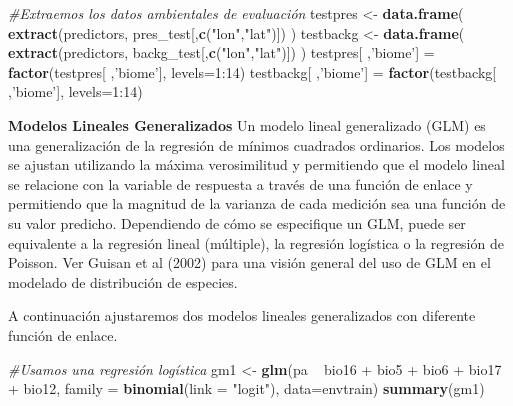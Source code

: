 \documentclass[]{article}
\newenvironment{Shaded}{\begin{snugshade}}{\end{snugshade}}
\newcommand{\KeywordTok}[1]{\textcolor[rgb]{0.13,0.29,0.53}{\textbf{{#1}}}}
\newcommand{\DataTypeTok}[1]{\textcolor[rgb]{0.13,0.29,0.53}{{#1}}}
\newcommand{\DecValTok}[1]{\textcolor[rgb]{0.00,0.00,0.81}{{#1}}}
\newcommand{\StringTok}[1]{\textcolor[rgb]{0.31,0.60,0.02}{{#1}}}
\newcommand{\CommentTok}[1]{\textcolor[rgb]{0.56,0.35,0.01}{\textit{{#1}}}}
\newcommand{\NormalTok}[1]{{#1}}
\begin{document}
\begin{Shaded}
\begin{Highlighting}[]
\CommentTok{#Extraemos los datos ambientales de evaluación}
\NormalTok{testpres <-}\StringTok{ }\KeywordTok{data.frame}\NormalTok{( }\KeywordTok{extract}\NormalTok{(predictors, pres_test[,}\KeywordTok{c}\NormalTok{(}\StringTok{"lon"}\NormalTok{,}\StringTok{"lat"}\NormalTok{)]) )}
\NormalTok{testbackg <-}\StringTok{ }\KeywordTok{data.frame}\NormalTok{( }\KeywordTok{extract}\NormalTok{(predictors, backg_test[,}\KeywordTok{c}\NormalTok{(}\StringTok{"lon"}\NormalTok{,}\StringTok{"lat"}\NormalTok{)]) )}
\NormalTok{testpres[ ,}\StringTok{'biome'}\NormalTok{] =}\StringTok{ }\KeywordTok{factor}\NormalTok{(testpres[ ,}\StringTok{'biome'}\NormalTok{], }\DataTypeTok{levels=}\DecValTok{1}\NormalTok{:}\DecValTok{14}\NormalTok{)}
\NormalTok{testbackg[ ,}\StringTok{'biome'}\NormalTok{] =}\StringTok{ }\KeywordTok{factor}\NormalTok{(testbackg[ ,}\StringTok{'biome'}\NormalTok{], }\DataTypeTok{levels=}\DecValTok{1}\NormalTok{:}\DecValTok{14}\NormalTok{)}
\end{Highlighting}
\end{Shaded}

\textbf{Modelos Lineales Generalizados} Un modelo lineal generalizado
(GLM) es una generalización de la regresión de mínimos cuadrados
ordinarios. Los modelos se ajustan utilizando la máxima verosimilitud y
permitiendo que el modelo lineal se relacione con la variable de
respuesta a través de una función de enlace y permitiendo que la
magnitud de la varianza de cada medición sea una función de su valor
predicho. Dependiendo de cómo se especifique un GLM, puede ser
equivalente a la regresión lineal (múltiple), la regresión logística o
la regresión de Poisson. Ver Guisan et al (2002) para una visión general
del uso de GLM en el modelado de distribución de especies.

A continuación ajustaremos dos modelos lineales generalizados con
diferente función de enlace.

\begin{Shaded}
\begin{Highlighting}[]
\CommentTok{#Usamos una regresión logística}
\NormalTok{gm1 <-}\StringTok{ }\KeywordTok{glm}\NormalTok{(pa ~}\StringTok{ }\NormalTok{bio16 +}\StringTok{ }\NormalTok{bio5 +}\StringTok{ }\NormalTok{bio6 +}\StringTok{ }\NormalTok{bio17 +}\StringTok{ }\NormalTok{bio12,}
            \DataTypeTok{family =} \KeywordTok{binomial}\NormalTok{(}\DataTypeTok{link =} \StringTok{"logit"}\NormalTok{), }\DataTypeTok{data=}\NormalTok{envtrain)}
\KeywordTok{summary}\NormalTok{(gm1)}
\end{Highlighting}
\end{Shaded}
\end{document}
